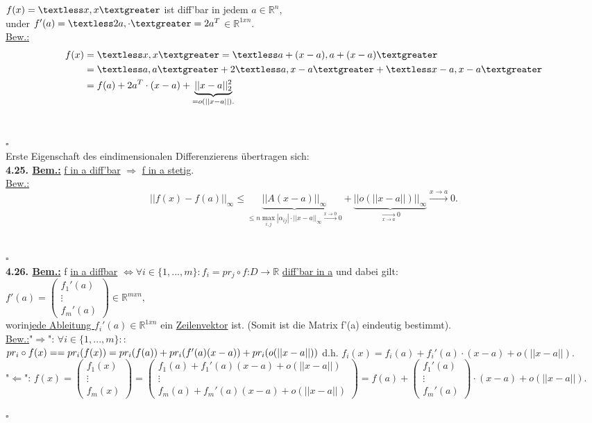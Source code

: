 \documentclass[]{scrartcl}
\begin{document}
\ul{$f(x)=\textless x,x\textgreater$} ist diff'bar in jedem 
$a\in\mathbb{R}^n$,\\
under \ul{$f'(a)=\textless 2a,\cdot\textgreater=2a^T$}$\in\mathbb{R}^{1xn}.$\\
\underline{Bew.:}
\begin{align}
	f(x)&=\textless x,x\textgreater=\textless a+(x-a), a+(x-a)\textgreater\\
	&=\textless a,a\textgreater+2\textless a,x-a\textgreater+\textless 
	x-a,x-a\textgreater\\
	&=f(a)+2a^T\cdot(x-a)+\underbrace{||x-a||_2^2}_{=o(||x-a||).}
\end{align}\\
\strut\hfill$\square$\\
Erste Eigenschaft des eindimensionalen Differenzierens übertragen sich:\\
\textbf{4.25. \underline{Bem.:}} \ul{f in a diff'bar} $\Rightarrow$ \ul{f in a 
stetig}.\\
\underline{Bew.:}
\begin{equation}
	||f(x)-f(a)||_\infty\leq \underbrace{||A(x-a)||_\infty}_{\leq n 
	\max_{i,j}|\alpha_{ij}|\cdot||x-a||_\infty\xrightarrow{x\rightarrow 
	0}0}+\underbrace{||o(||x-a||)||_\infty}_{\xrightarrow[x\rightarrow a]{ 
	}0}\xrightarrow{x\rightarrow a}0.
\end{equation}\\
\strut\hfill$\square$\\
\textbf{4.26. \underline{Bem.:}} f \ul{in a diffbar} $\Leftrightarrow \forall i 
\in \{1,...,m\}:$\ul{$f_i=pr_j\circ f$}:$D\rightarrow\mathbb{R}$ \ul{diff'bar 
in a} und dabei gilt:\\
$f'(a)=\begin{pmatrix}
	f_1'(a)\\\vdots\\f_m'(a)
\end{pmatrix}\in \mathbb{R}^{m x n},$\\
worin\ul{jede Ableitung $f_i'(a)\in\mathbb{R}^{1 x n}$} ein \ul{Zeilenvektor} 
ist. (Somit ist die Matrix f'(a) eindeutig bestimmt).\\
\underline{Bew.:}"$\Rightarrow$": $\forall i \in \{1,...,m\}::$\\
$pr_i \circ f(x)==pr_i(f(x))=pr_i(f(a))+pr_i(f'(a)(x-a))+pr_i(o(||x-a||))\\$
d.h. $f_i(x)= f_i(a)+f_i'(a)\cdot(x-a)+o(||x-a||).$\\
"$\Leftarrow$": $f(x)=\begin{pmatrix}
	f_1(x)\\\vdots\\f_m(x)
\end{pmatrix}=\begin{pmatrix}
f_1(a)+f_1'(a)(x-a)+o(||x-a||)\\\vdots\\f_m(a)+f_m'(a)(x-a)+o(||x-a||)
\end{pmatrix}=f(a)+\begin{pmatrix}
	f_1'(a)\\\vdots\\f_m'(a)
\end{pmatrix}\cdot(x-a)+o(||x-a||).$\\
\strut\hfill$\square$\\
\end{document}
